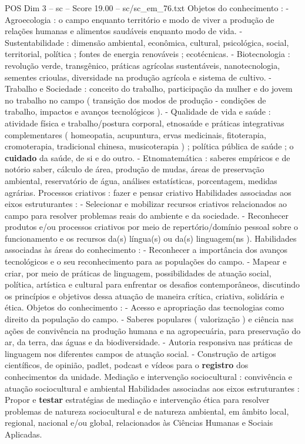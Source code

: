 \begin{textsample}{POS Dim 3 – sc – Score 19.00 – sc/sc\_em\_76.txt}
Objetos do conhecimento : - Agroecologia : o campo enquanto território e modo de viver a produção de relações humanas e alimentos saudáveis enquanto modo de vida. - Sustentabilidade : dimensão ambiental, econômica, cultural, psicológica, social, territorial, política ; fontes de energia renováveis ; ecotécnicas. - Biotecnologia : revolução verde, transgênico, práticas agrícolas sustentáveis, nanotecnologia, sementes crioulas, diversidade na produção agrícola e sistema de cultivo. - Trabalho e Sociedade : conceito do trabalho, participação da mulher e do jovem no trabalho no campo ( transição dos modos de produção - condições de trabalho, impactos e avanços tecnológicos ). - Qualidade de vida e saúde : atividade física e trabalho/postura corporal, etnosaúde e práticas integrativas complementares ( homeopatia, acupuntura, ervas medicinais, fitoterapia, cromoterapia, tradicional chinesa, musicoterapia ) ; política pública de saúde ; o \textbf{cuidado} da saúde, de si e do outro. - Etnomatemática : saberes empíricos e de notório saber, cálculo de área, produção de mudas, áreas de preservação ambiental, reservatório de água, análises estatísticas, porcentagem, medidas agrárias.
Processos criativos : fazer e pensar criativo Habilidades associadas aos eixos estruturantes : - Selecionar e mobilizar recursos criativos relacionados ao campo para resolver problemas reais do ambiente e da sociedade. - Reconhecer produtos e/ou processos criativos por meio de repertório/domínio pessoal sobre o funcionamento e os recursos da(s) língua(s) ou da(s) linguagem(ns ).
Habilidades associadas às áreas do conhecimento : - Reconhecer a importância dos avanços tecnológicos e o seu reconhecimento para as populações do campo. - Mapear e criar, por meio de práticas de linguagem, possibilidades de atuação social, política, artística e cultural para enfrentar os desafios contemporâneos, discutindo os princípios e objetivos dessa atuação de maneira crítica, criativa, solidária e ética.
Objetos do conhecimento : - Acesso e apropriação das tecnologias como direito da população do campo. - Saberes populares ( valorização ) e ciência nas ações de convivência na produção humana e na agropecuária, para preservação do ar, da terra, das águas e da biodiversidade. - Autoria responsiva nas práticas de linguagem nos diferentes campos de atuação social. - Construção de artigos científicos, de opinião, padlet, podcast e vídeos para o \textbf{registro} dos conhecimentos da unidade.
Mediação e intervenção sociocultural : convivência e atuação sociocultural e ambiental Habilidades associadas aos eixos estruturantes : Propor e \textbf{testar} estratégias de mediação e intervenção ética para resolver problemas de natureza sociocultural e de natureza ambiental, em âmbito local, regional, nacional e/ou global, relacionados às Ciências Humanas e Sociais Aplicadas.

\end{textsample}
